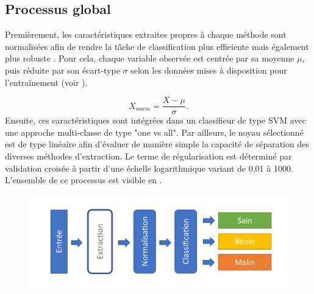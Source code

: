 \documentclass{gretsi}
\begin{document}
\begin{sloppypar}
\subsection{Processus global}
Premièrement, les caractéristiques extraites propres à chaque méthode sont normalisées afin de rendre la tâche de classification plus efficiente mais également plus robuste \cite{graf2001}. Pour cela, chaque variable observée est centrée par sa moyenne $\mu$, puis réduite par son écart-type $\sigma$ selon les données mises à disposition pour l'entraînement (voir ).\par
\begin{equation}
    X_{norm} = \frac{X-\mu}{\sigma}.
    \label{standard_score}
\end{equation}
Ensuite, ces caractéristiques sont intégrées dans un classifieur de type SVM avec une approche multi-classe de type "one vs all". Par ailleurs, le noyau sélectionné est de type linéaire afin d'évaluer de manière simple la capacité de séparation des diverses méthodes d'extraction. Le terme de régularisation est déterminé par validation croisée à partir d'une échelle logarithmique variant de 0,01 à 1000. L'ensemble de ce processus est visible en .\par
\par
\begin{figure}[h]
    \begin{center} 
        \includegraphics[width=0.8\linewidth]{content/figures/Processus.pdf}
        \label{pipeline}
    \end{center} 
\end{figure}


\end{sloppypar}
\end{document}
